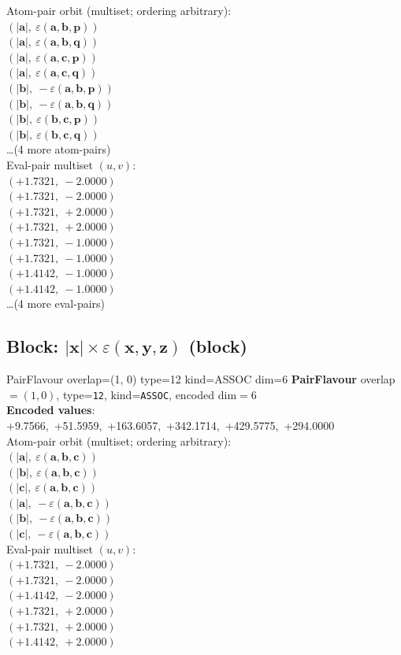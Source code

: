 \documentclass[a4paper,11pt]{article}
\newcommand{\vc}[1]{\ensuremath{\mathbf{#1}}}
\newcommand{\dnfagmiihhiejm}[1]{|\vc{#1}|}
\newcommand{\kblbmcpggoncpf}[3]{\varepsilon(\mathbf{#1},\mathbf{#2},\mathbf{#3})}
\begin{document}
\quad Atom-pair orbit (multiset; ordering arbitrary):\\
$(\dnfagmiihhiejm{a},\ \kblbmcpggoncpf{a}{b}{p})$\\
$(\dnfagmiihhiejm{a},\ \kblbmcpggoncpf{a}{b}{q})$\\
$(\dnfagmiihhiejm{a},\ \kblbmcpggoncpf{a}{c}{p})$\\
$(\dnfagmiihhiejm{a},\ \kblbmcpggoncpf{a}{c}{q})$\\
$(\dnfagmiihhiejm{b},\ -\kblbmcpggoncpf{a}{b}{p})$\\
$(\dnfagmiihhiejm{b},\ -\kblbmcpggoncpf{a}{b}{q})$\\
$(\dnfagmiihhiejm{b},\ \kblbmcpggoncpf{b}{c}{p})$\\
$(\dnfagmiihhiejm{b},\ \kblbmcpggoncpf{b}{c}{q})$\\
\quad \ldots (4 more atom-pairs)\\
\quad Eval-pair multiset $(u, v)$:\\
$(+1.7321,\ -2.0000)$\\
$(+1.7321,\ -2.0000)$\\
$(+1.7321,\ +2.0000)$\\
$(+1.7321,\ +2.0000)$\\
$(+1.7321,\ -1.0000)$\\
$(+1.7321,\ -1.0000)$\\
$(+1.4142,\ -1.0000)$\\
$(+1.4142,\ -1.0000)$\\
\quad \ldots (4 more eval-pairs)\\

\subsection{Block: $\dnfagmiihhiejm{x} \times \kblbmcpggoncpf{x}{y}{z}$  (block)}
    PairFlavour  overlap=(1, 0)  type=12  kind=ASSOC  dim=6
\textbf{PairFlavour} overlap$=(1, 0)$, type=\texttt{12}, kind=\texttt{ASSOC}, encoded dim$=6$\\
\textbf{      Encoded values}: +9.7566,\ +51.5959,\ +163.6057,\ +342.1714,\ +429.5775,\ +294.0000\\
\quad Atom-pair orbit (multiset; ordering arbitrary):\\
$(\dnfagmiihhiejm{a},\ \kblbmcpggoncpf{a}{b}{c})$\\
$(\dnfagmiihhiejm{b},\ \kblbmcpggoncpf{a}{b}{c})$\\
$(\dnfagmiihhiejm{c},\ \kblbmcpggoncpf{a}{b}{c})$\\
$(\dnfagmiihhiejm{a},\ -\kblbmcpggoncpf{a}{b}{c})$\\
$(\dnfagmiihhiejm{b},\ -\kblbmcpggoncpf{a}{b}{c})$\\
$(\dnfagmiihhiejm{c},\ -\kblbmcpggoncpf{a}{b}{c})$\\
\quad Eval-pair multiset $(u, v)$:\\
$(+1.7321,\ -2.0000)$\\
$(+1.7321,\ -2.0000)$\\
$(+1.4142,\ -2.0000)$\\
$(+1.7321,\ +2.0000)$\\
$(+1.7321,\ +2.0000)$\\
$(+1.4142,\ +2.0000)$\\
\end{document}
